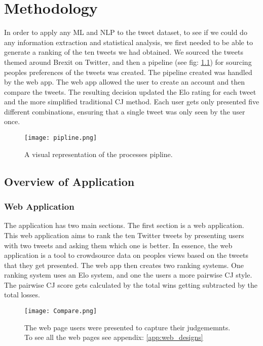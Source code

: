 
\chapter{Methodology}
	\label{chap:typesetting}
	In order to apply any ML and NLP to the tweet dataset, to see if we could do any information extraction and statistical analysis, we first needed to be able to generate a ranking of the ten tweets we had obtained. We sourced the tweets themed around Brexit on Twitter, and then a pipeline (see fig: \ref{fig:pipeline}) for sourcing peoples preferences of the tweets was created. The pipeline created was handled by the web app. The web app allowed the user to create an account and then compare the tweets. The resulting decision updated the Elo rating for each tweet and the more simplified traditional CJ method. Each user gets only presented five different combinations, ensuring that a single tweet was only seen by the user once.
	
	\begin{figure}[h]
		\texttt{[image: pipline.png]}
		\caption{A visual representation of the processes pipline.}
		\label{fig:pipeline}
		
	\end{figure}

	\section{Overview of Application}
	
	\subsection{Web Application}
	The application has two main sections. The first section is a web application. This web application aims to rank the ten Twitter tweets by presenting users with two tweets and asking them which one is better. In essence, the web application is a tool to crowdsource data on peoples views based on the tweets that they get presented. The web app then creates two ranking systems. One ranking system uses an Elo system, and one the users a more pairwise CJ style. The pairwise CJ score gets calculated by the total wins getting subtracted by the total losses.
	
	\begin{figure}[h]
		\centering
		\texttt{[image: Compare.png]}
		\caption{The web page users were presented to capture their judgememnts. To see all the web pages see appendix: \ref{app:web_designs}}
		\label{fig:web_app_example}
		
	\end{figure} 

